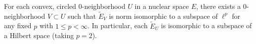 For each convex, circled $0$-neighborhood $U$ in a nuclear space $E$, there exists a $0$-neighborhood $V \subset U$ such that $\tilde{E}_V$ is norm isomorphic to a subspace of $\ell^p$ for any fixed $p$ with $1 \leq p < \infty$. In particular, each $\tilde{E}_U$ is isomorphic to a subspace of a Hilbert space (taking $p = 2$).
